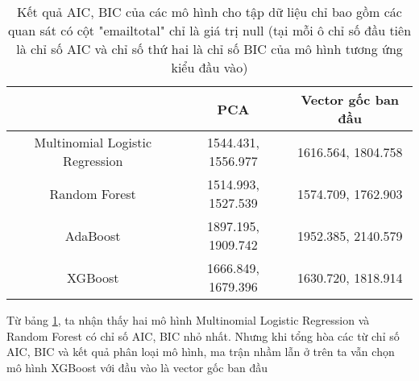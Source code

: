 \begin{table}[h!]
    \centering
    \begin{tabular}{|c|c|c|}
        \hline
        & PCA & Vector gốc ban đầu \\
        \hline
        Multinomial Logistic Regression & 1544.431, 1556.977 & 1616.564, 1804.758 \\
        \hline
        Random Forest & 1514.993, 1527.539 & 1574.709, 1762.903 \\
        \hline
        AdaBoost & 1897.195, 1909.742 & 1952.385, 2140.579 \\
        \hline
        XGBoost & 1666.849, 1679.396 & 1630.720, 1818.914 \\
        \hline
    \end{tabular}
    \caption{Kết quả AIC, BIC của các mô hình cho tập dữ liệu chỉ bao gồm các quan sát có cột "emailtotal" chỉ là giá trị null (tại mỗi ô chỉ số đầu tiên là chỉ số AIC và chỉ số thứ hai là chỉ số BIC của mô hình tương ứng kiểu đầu vào)}
    \label{tab:With_null_AIC_BIC_Models}
\end{table}

Từ bảng \ref{tab:With_null_AIC_BIC_Models}, ta nhận thấy hai mô hình Multinomial Logistic Regression và Random Forest có chỉ số AIC, BIC nhỏ nhất.
Nhưng khi tổng hòa các từ chỉ số AIC, BIC và kết quả phân loại mô hình, ma trận nhầm lẫn ở trên ta vẫn chọn mô hình XGBoost với đầu vào là vector gốc ban đầu